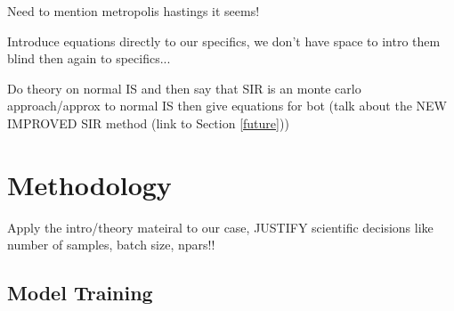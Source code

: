 \documentclass[aps,superscriptaddress,twocolumn,nopreprintnumbers,floatfix,groupedaddress]{revtex4-1}
\begin{document}
%
%
%


Need to mention metropolis hastings it seems!

Introduce equations directly to our specifics, we don't have space to intro them blind then again to specifics...



Do theory on normal IS and then say that SIR is an monte carlo approach/approx to normal IS then give equations for bot (talk about the NEW IMPROVED SIR method (link to Section \ref{future}))

%

\section{Methodology}\label{methods}

Apply the intro/theory mateiral to our case, JUSTIFY scientific decisions like number of samples, batch size, npars!!

\subsection{Model Training}
\end{document}

